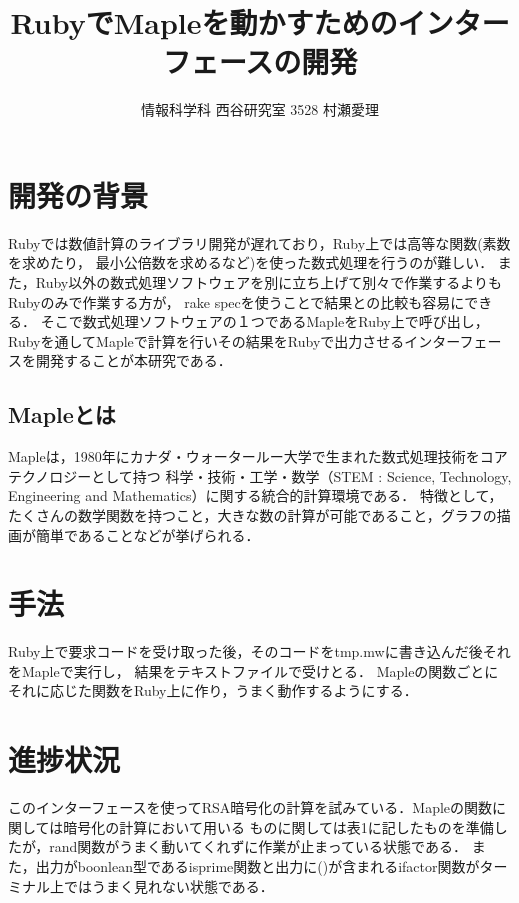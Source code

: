 \documentclass[10pt,a4j,twocolumn]{jsarticle}
\begin{document}
\title{RubyでMapleを動かすためのインターフェースの開発}
\author{情報科学科 西谷研究室 3528 村瀬愛理}
\date{}
\maketitle
\section{開発の背景}
Rubyでは数値計算のライブラリ開発が遅れており，Ruby上では高等な関数(素数を求めたり，
最小公倍数を求めるなど)を使った数式処理を行うのが難しい．
また，Ruby以外の数式処理ソフトウェアを別に立ち上げて別々で作業するよりもRubyのみで作業する方が，
rake specを使うことで結果との比較も容易にできる．
そこで数式処理ソフトウェアの１つであるMapleをRuby上で呼び出し，
Rubyを通してMapleで計算を行いその結果をRubyで出力させるインターフェースを開発することが本研究である．

\subsection{Mapleとは}
Mapleは，1980年にカナダ・ウォータールー大学で生まれた数式処理技術をコアテクノロジーとして持つ
科学・技術・工学・数学（STEM : Science, Technology, Engineering and Mathematics）に関する統合的計算環境である\cite{hp}．
特徴として，たくさんの数学関数を持つこと，大きな数の計算が可能であること，グラフの描画が簡単であることなどが挙げられる．

\section{手法}
Ruby上で要求コードを受け取った後，そのコードをtmp.mwに書き込んだ後それをMapleで実行し，
結果をテキストファイルで受けとる．
Mapleの関数ごとにそれに応じた関数をRuby上に作り，うまく動作するようにする．

\section{進捗状況}
このインターフェースを使ってRSA暗号化の計算を試みている．Mapleの関数に関しては暗号化の計算において用いる
ものに関しては表1に記したものを準備したが，rand関数がうまく動いてくれずに作業が止まっている状態である．
また，出力がboonlean型であるisprime関数と出力に()が含まれるifactor関数がターミナル上ではうまく見れない状態である．
\end{document}
